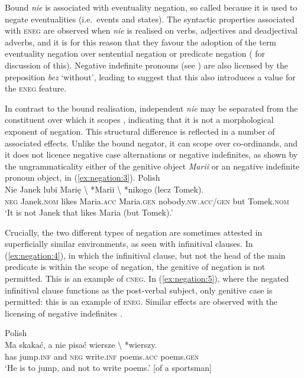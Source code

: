 \documentclass[output=paper,hidelinks]{langscibook}
\begin{document}
Bound \emph{nie} is associated with eventuality negation, so called because it is used to negate eventualities (i.e.\ events and states). The syntactic properties associated with \textsc{eneg} are observed when \emph{nie} is realised on verbs, adjectives and deadjectival adverbs, and it is for this reason that they favour the adoption of the term eventuality negation over sentential negation or predicate negation (\citet [324--326]{przepiorkowski2015two} for discussion of this). Negative indefinite pronouns (see ) are also licensed by the preposition \emph{bez} `without', leading \citet [326]{przepiorkowski2015two} to suggest that this also introduces a value for the \textsc{eneg} feature.

In contrast to the bound realisation, independent \emph{nie} may be separated from the constituent over which it scopes \citep [329]{przepiorkowski2015two}, indicating that it is not a morphological exponent of negation. This structural difference is reflected in a number of associated effects. Unlike the bound negator, it can scope over co-ordinands, and it does not licence negative case alternations or negative indefinites, as shown by the ungrammaticality either of the genitive object \emph{Marii}  or an negative indefinite pronoun object, in (\ref{ex:negation:3}).
\ea
\label{ex:negation:3}Polish \citep [326]{przepiorkowski2015two}\\
\gll Nie Janek lubi Marię \textbackslash{} *Marii \textbackslash{}  *nikogo (lecz Tomek).\\  
     \textsc{neg}  Janek.\textsc{nom} likes Maria.\textsc{acc} {}  { Maria.\textsc{gen}} {}  { nobody.\textsc{nw.acc/gen}} but Tomek.\textsc{nom}\\ 
\glt `It is not Janek that likes Maria (but Tomek).'
\z

Crucially, the two different types of negation are sometimes attested in superficially similar environments, as seen with infinitival clauses. In (\ref{ex:negation:4}), in which the infinitival clause, but not the head of the main predicate is within the scope of negation, the genitive of negation is not permitted. This is an example of \textsc{cneg}. In (\ref{ex:negation:5}), where the negated infinitival clause functions as the post-verbal subject, only genitive case is permitted: this is an example of \textsc{eneg}. Similar effects are observed with the licensing of negative indefinites \citep [327]{przepiorkowski2015two}.

\ea Polish  \citep [326]{przepiorkowski2015two}\\
\label{ex:negation:4}
\gll Ma skakać, a nie pisać wiersze \textbackslash{} *wierszy.\\  
    has jump.\textsc{inf} and \textsc{neg} write.\textsc{inf}  {poems.\textsc{acc}} {}  { poems.\textsc{gen}}\\ 
\glt `He is to jump, and not to write poems.' [of a sportsman]
\z
\end{document}
